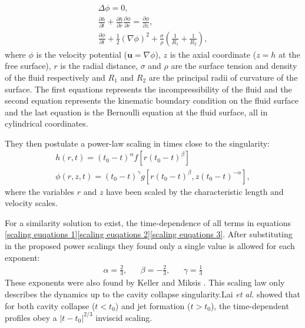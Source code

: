 \begin{gather}\label{scaling euqations 1}
    \Delta\phi=0,\\ \label{scaling euqations 2}
    \frac{\partial h}{\partial t}+\frac{\partial h}{\partial r}\frac{\partial \phi}{\partial r}=\frac{\partial \phi}{\partial z},\\ \label{scaling euqations 3}
    \frac{\partial \phi}{\partial t} + \frac{1}{2}(\nabla \phi)^2 + \frac{\sigma}{\rho}\left( \frac{1}{R_1}+\frac{1}{R_2}\right),
\end{gather}
where $\phi$ is the velocity potential ($\textbf{u}=\nabla \phi$), $z$ is the axial coordinate ($z=h$ at the free surface), $r$ is the radial distance, $\sigma$ and $\rho$ are the surface tension and density of the fluid respectively and $R_1$ and $R_2$ are the principal radii of curvature of the surface. The first equations represents the incompressibility of the fluid and the second equation represents the kinematic boundary condition on the fluid surface and the last equation is the Bernoulli equation at the fluid surface, all in cylindrical coordinates.

They then postulate a power-law scaling in times close to the singularity:
\begin{gather}\label{postulated 1}
    h(r,t)=(t_0-t)^{\alpha}f[r(t_0-t)^{\beta}]\\ \label{postulated 2}
    \phi(r,z,t)=(t_0-t)^{\gamma}g[r(t_0-t)^{\beta},z(t_0-t)^{-\alpha}],
\end{gather}
where the variables $r$ and $z$ have been scaled by the characteristic length and velocity scales.

For a similarity solution to exist, the time-dependence of all terms in equations \ref{scaling euqations 1}\ref{scaling euqations 2}\ref{scaling euqations 3}. After substituting in the proposed power scalings they found only a single value is allowed for each exponent:
\begin{align}
    \alpha=\frac{2}{3}, &&\beta = -\frac{2}{3}, && \gamma=\frac{1}{3}
\end{align}
These exponents were also found by Keller and Miksis \cite{keller1983surface}. This scaling law only describes the dynamics up to the cavity collapse singularity.Lai \textit{et al.} showed that for both cavity collapse ($t<t_0$) and jet formation ($t>t_0$), the time-dependent profiles obey a $|t-t_0|^{2/3}$ inviscid scaling\cite{lai2018bubble}.